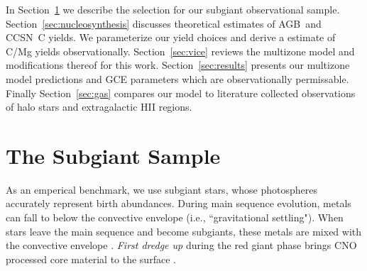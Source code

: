 \documentclass[fleqn,
usenatbib]{mnras}
\newcommand{\agb}{AGB}
\newcommand{\cc}{CCSN}
\newcommand{\strike}[1]{{\color{ForestGreen} \sout{#1}}}
\begin{document}
In Section~\ref{sec:data_selection} we describe the selection for our subgiant observational sample.
Section~\ref{sec:nucleosynthesis} discusses theoretical estimates of \agb\ and \cc\ C yields. We parameterize our yield choices and derive a estimate of C/Mg yields observationally.
Section~\ref{sec:vice} reviews the multizone model and modifications thereof for this work.
Section~\ref{sec:results} presents our multizone model predictions and GCE parameters which are observationally permissable. 
Finally Section~\ref{sec:gas} compares our model to literature collected observations of halo stars and extragalactic HII regions. 







\section{The Subgiant Sample}\label{sec:data_selection}




As an emperical benchmark, we use subgiant stars, whose photospheres accurately represent birth abundances. 
During main sequence evolution, metals can fall to below the convective envelope (i.e., ``gravitational settling").
When stars leave the main sequence and become subgiants, these metals are mixed with the convective envelope \citep[]{gratton+00, souto19}. 
 \textit{First dredge up} during the red giant phase brings CNO processed core material to the surface \citep{iben67, KL14}.
\end{document}
